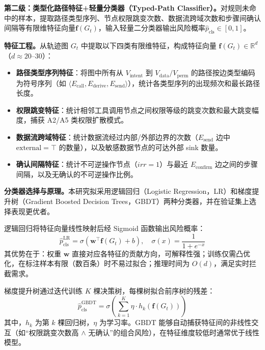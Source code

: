 \textbf{第二级：类型化路径特征+轻量分类器（Typed-Path Classifier）。}对规则未命中的样本，提取路径类型序列、节点权限跳变次数、数据流跨域次数和步骤间确认间隔等有限维特征向量$\mathbf{f}(G_t)$，输入轻量二分类器输出风险概率$\hat{p}_{\text{cls}} \in [0,1]$。

\textbf{特征工程。}从轨迹图 $G_t$ 中提取以下四类有限维特征，构成特征向量 $\mathbf{f}(G_t) \in \mathbb{R}^d$（$d \approx 20$--$30$）：
\begin{itemize}[leftmargin=2em,itemsep=0pt]
  \item \textbf{路径类型序列特征}：将图中所有从 $V_{\text{intent}}$ 到 $V_{\text{data}}/V_{\text{perm}}$ 的路径按边类型编码为符号序列（如 $\langle E_{\text{call}}, E_{\text{derive}}, E_{\text{send}}\rangle$），统计各类型序列的出现频次和最长路径长度。
  \item \textbf{权限跳变特征}：统计相邻工具调用节点之间权限等级的跳变次数和最大跳变幅度，捕获 A2/A5 类权限扩散模式。
  \item \textbf{数据流跨域特征}：统计数据流经过内部/外部边界的次数（$E_{\text{send}}$ 边中 $\text{external}=\top$ 的数量），以及敏感数据节点的可达外部 sink 数量。
  \item \textbf{确认间隔特征}：统计不可逆操作节点（$irr=1$）与最近 $E_{\text{confirm}}$ 边之间的步骤间隔，以及无确认的不可逆操作比例。
\end{itemize}

\textbf{分类器选择与原理。}本研究拟采用逻辑回归（Logistic Regression，LR）和梯度提升树（Gradient Boosted Decision Trees，GBDT）两种分类器，并在验证集上选择表现更优者。

逻辑回归将特征向量线性映射后经 Sigmoid 函数输出风险概率：
\begin{equation}
  \hat{p}_{\text{cls}}^{\text{LR}} = \sigma(\mathbf{w}^\top \mathbf{f}(G_t) + b), \quad \sigma(x) = \frac{1}{1+e^{-x}}
  \label{eq:lr_cls}
\end{equation}
其优势在于：权重 $\mathbf{w}$ 直接对应各特征的贡献方向，可解释性强；训练仅需凸优化，在标注样本有限（数百条）时不易过拟合；推理时间为 $O(d)$，满足实时拦截需求。

梯度提升树通过迭代训练 $K$ 棵决策树，每棵树拟合前序树的残差：
\begin{equation}
  \hat{p}_{\text{cls}}^{\text{GBDT}} = \sigma\!\left(\sum_{k=1}^{K} \eta \cdot h_k(\mathbf{f}(G_t))\right)
  \label{eq:gbdt_cls}
\end{equation}
其中，$h_k$ 为第 $k$ 棵回归树，$\eta$ 为学习率。GBDT 能够自动捕获特征间的非线性交互（如“权限跳变次数高 $\wedge$ 无确认”的组合风险），在特征维度较低时通常优于线性模型。

